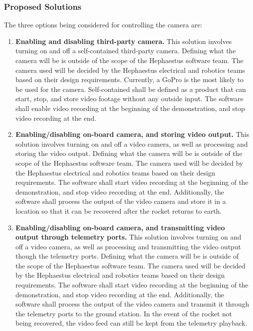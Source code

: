 \documentclass[letterpaper,10pt]{article}
\begin{document}
\subsubsection{Proposed Solutions}
The three options being considered for controlling the camera are:
\begin{enumerate}
\item{
\textbf{Enabling and disabling third-party camera.}
This solution involves turning on and off a self-contained third-party camera.
Defining what the camera will be is outside of the scope of the Hephaestus software team.
The camera used will be decided by the Hephaestus electrical and robotics teams
based on their design requirements.
Currently, a GoPro is the most likely to be used for the camera.
Self-contained shall be defined as a product that can start, stop, and store video
footage without any outside input.
The software shall enable video recording at the beginning of the demonstration,
and stop video recording at the end.
}

\item{
\textbf{Enabling/disabling on-board camera, and storing video output.}
This solution involves turning on and off a video camera, as well as processing and storing the video output.
Defining what the camera will be is outside of the scope of the Hephaestus software team.
The camera used will be decided by the Hephaestus electrical and robotics teams
based on their design requirements.
The software shall start video recording at the beginning of the demonstration,
and stop video recording at the end.
Additionally, the software shall process the output of the video camera and store
it in a location so that it can be recovered after the rocket returns to earth.
}

\item{
\textbf{Enabling/disabling on-board camera, and transmitting video output through telemetry ports.}
This solution involves turning on and off a video camera, as well as processing and transmitting the video output though the telemetry ports.
Defining what the camera will be is outside of the scope of the Hephaestus software team.
The camera used will be decided by the Hephaestus electrical and robotics teams
based on their design requirements.
The software shall start video recording at the beginning of the demonstration,
and stop video recording at the end.
Additionally, the software shall process the output of the video camera and transmit
it through the telemetry ports to the ground station.
In the event of the rocket not being recovered, the video feed can still be kept
from the telemetry playback.
}
\end{enumerate}
\end{document}
